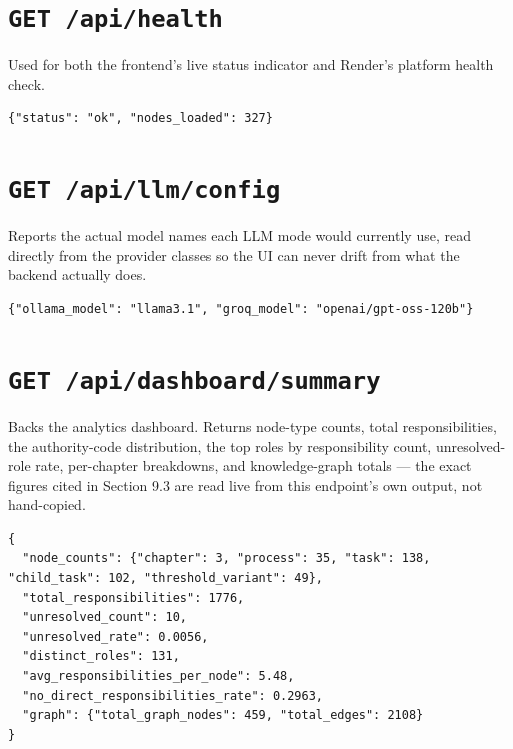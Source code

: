 \section{\texttt{GET /\allowbreak{}api/\allowbreak{}health}}
Used for both the frontend's live status indicator and Render's platform health check.

\begin{lstlisting}[caption={example response}]
{"status": "ok", "nodes_loaded": 327}
\end{lstlisting}
\section{\texttt{GET /\allowbreak{}api/\allowbreak{}llm/\allowbreak{}config}}
Reports the actual model names each LLM mode would currently use, read directly from the provider classes so the UI can never drift from what the backend actually does.

\begin{lstlisting}[caption={example response}]
{"ollama_model": "llama3.1", "groq_model": "openai/gpt-oss-120b"}
\end{lstlisting}
\section{\texttt{GET /\allowbreak{}api/\allowbreak{}dashboard/\allowbreak{}summary}}
Backs the analytics dashboard. Returns node-type counts, total responsibilities, the authority-code distribution, the top roles by responsibility count, unresolved-role rate, per-chapter breakdowns, and knowledge-graph totals — the exact figures cited in Section 9.3 are read live from this endpoint's own output, not hand-copied.

\begin{lstlisting}[caption={example response, abbreviated}]
{
  "node_counts": {"chapter": 3, "process": 35, "task": 138, "child_task": 102, "threshold_variant": 49},
  "total_responsibilities": 1776,
  "unresolved_count": 10,
  "unresolved_rate": 0.0056,
  "distinct_roles": 131,
  "avg_responsibilities_per_node": 5.48,
  "no_direct_responsibilities_rate": 0.2963,
  "graph": {"total_graph_nodes": 459, "total_edges": 2108}
}
\end{lstlisting}
